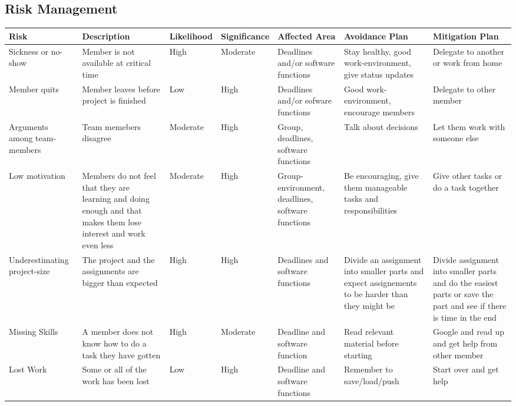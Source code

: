 \documentclass{report}
\begin{document}
\begin{landscape}

\section{Risk Management} \label{sec:risk_management}
\begin{longtable}{| p{3cm} | p{4cm}| l | l | p{3cm} | p{4cm}| p{4cm} |} \hline
Risk & Description & Likelihood & Significance & Affected Area & Avoidance Plan & Mitigation Plan \\ \hline
Sickness or no-show & Member is not available at critical time & High & Moderate & Deadlines and/or software functions & Stay healthy, good work-environment, give status updates & Delegate to another or work from home \\ \hline
Member quits & Member leaves before project is finished & Low & High & Deadlines and/or sofware functions & Good work-environment, encourage members & Delegate to other member \\ \hline
Arguments among team-members & Team memebers disagree & Moderate & High & Group, deadlines, software functions & Talk about decisions & Let them work with someone else \\ \hline
Low motivation & Members do not feel that they are learning and doing enough and that makes them lose interest and work even less & Moderate & High & Group-environment, deadlines, software functions & Be encouraging, give them manageable tasks and responsibilities & Give other tasks or do a task together\\ \hline
Underestimating project-size & The project and the assignments are bigger than expected & High & High & Deadlines and software functions & Divide an assignment into smaller parts and expect assignements to be harder than they might be & Divide assignment into smaller parts and do the easiest parts or save the part and see if there is time in the end \\ \hline
Missing Skills & A member does not know how to do a task they have gotten & High & Moderate & Deadline and software function & Read relevant material before starting & Google and read up and get help from other member \\ \hline
Lost Work & Some or all of the work has been lost & Low & High & Deadline and software functions & Remember to save/load/push  & Start over and get help \\ \hline

\end{longtable}
\end{landscape}
\end{document}
